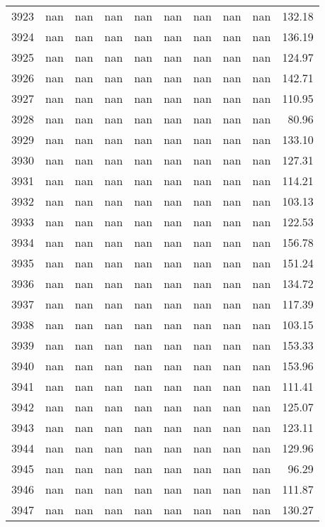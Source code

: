 \begin{tabular}{lrrrrrrrrr}
3923 & nan & nan & nan & nan & nan & nan & nan & nan & 132.18 \\
3924 & nan & nan & nan & nan & nan & nan & nan & nan & 136.19 \\
3925 & nan & nan & nan & nan & nan & nan & nan & nan & 124.97 \\
3926 & nan & nan & nan & nan & nan & nan & nan & nan & 142.71 \\
3927 & nan & nan & nan & nan & nan & nan & nan & nan & 110.95 \\
3928 & nan & nan & nan & nan & nan & nan & nan & nan & 80.96 \\
3929 & nan & nan & nan & nan & nan & nan & nan & nan & 133.10 \\
3930 & nan & nan & nan & nan & nan & nan & nan & nan & 127.31 \\
3931 & nan & nan & nan & nan & nan & nan & nan & nan & 114.21 \\
3932 & nan & nan & nan & nan & nan & nan & nan & nan & 103.13 \\
3933 & nan & nan & nan & nan & nan & nan & nan & nan & 122.53 \\
3934 & nan & nan & nan & nan & nan & nan & nan & nan & 156.78 \\
3935 & nan & nan & nan & nan & nan & nan & nan & nan & 151.24 \\
3936 & nan & nan & nan & nan & nan & nan & nan & nan & 134.72 \\
3937 & nan & nan & nan & nan & nan & nan & nan & nan & 117.39 \\
3938 & nan & nan & nan & nan & nan & nan & nan & nan & 103.15 \\
3939 & nan & nan & nan & nan & nan & nan & nan & nan & 153.33 \\
3940 & nan & nan & nan & nan & nan & nan & nan & nan & 153.96 \\
3941 & nan & nan & nan & nan & nan & nan & nan & nan & 111.41 \\
3942 & nan & nan & nan & nan & nan & nan & nan & nan & 125.07 \\
3943 & nan & nan & nan & nan & nan & nan & nan & nan & 123.11 \\
3944 & nan & nan & nan & nan & nan & nan & nan & nan & 129.96 \\
3945 & nan & nan & nan & nan & nan & nan & nan & nan & 96.29 \\
3946 & nan & nan & nan & nan & nan & nan & nan & nan & 111.87 \\
3947 & nan & nan & nan & nan & nan & nan & nan & nan & 130.27 \\

\end{tabular}
